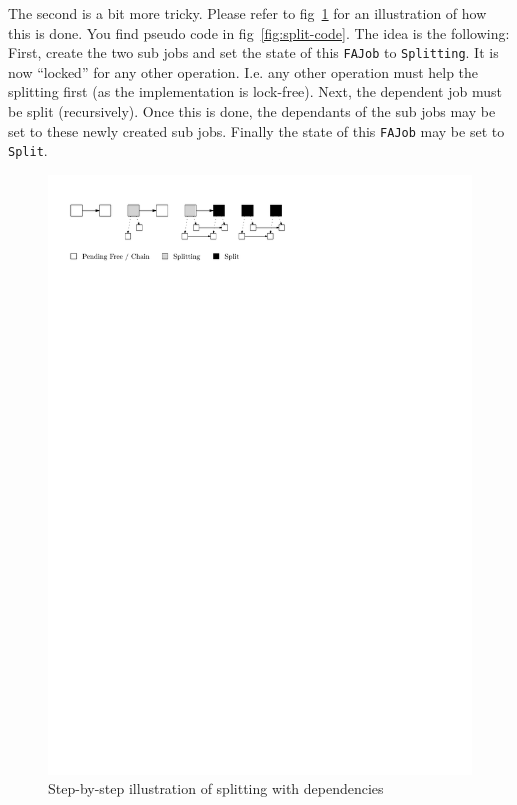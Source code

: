 \documentclass[runningheads,a4paper,fleqn]{llncs}
\begin{document}
The second is a bit more tricky. Please refer to fig~\ref{fig:split-ill}
for an illustration of how this is done. You find pseudo code in
fig~\ref{fig:split-code}. The idea is the following: First, create the
two sub jobs and set the state of this \texttt{FAJob} to
\texttt{Splitting}. It is now ``locked'' for any other operation. I.e. any
other operation must help the splitting first (as the implementation
is lock-free). Next, the dependent job must be split
(recursively). Once this is done, the dependants of the sub jobs may be
set to these newly created sub jobs. Finally the state of this
\texttt{FAJob} may be set to \texttt{Split}.

\begin{figure}
  \centering
  \includegraphics{split}
  \caption{Step-by-step illustration of splitting with dependencies}
  \label{fig:split-ill}
\end{figure}
\end{document}
